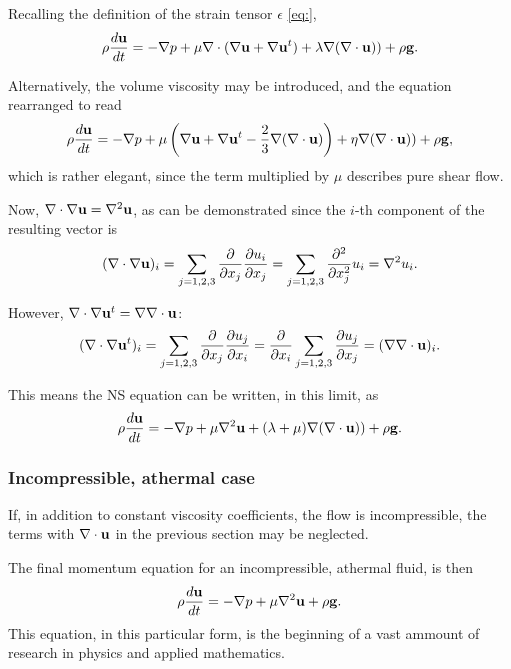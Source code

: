 Recalling the definition of the strain tensor $\epsilon$ \ref{eq:},
\begin{equation*}
  \rho \frac{d\mathbf{u} }{dt} =
  - \nabla p +
  \mu \nabla \cdot  ( \nabla\mathbf{u} + \nabla\mathbf{u}^t )
  + \lambda \nabla ( \nabla\cdot\mathbf{u} ) )
  + \rho \mathbf{g} .
\end{equation*}

Alternatively, the volume viscosity may be introduced, and
the equation rearranged to read
\begin{equation*}
  \rho \frac{d\mathbf{u} }{dt} =
  - \nabla p 
  + \mu \left(  \nabla\mathbf{u} + \nabla\mathbf{u}^t  - \frac23 \nabla ( \nabla\cdot\mathbf{u} ) \right)
  +  \eta \nabla ( \nabla\cdot\mathbf{u} ) )
  + \rho \mathbf{g} ,
\end{equation*}
which is rather elegant, since the term multiplied by $\mu$ describes
pure shear flow.

Now, $\nabla \cdot  \nabla\mathbf{u} = \nabla^2 \mathbf{u}$, as can be demonstrated
since the $i$-th component of the resulting vector is
\[
(\nabla \cdot \nabla\mathbf{u} )_i =
\sum_{j=1,2,3} 
\frac{\partial}{\partial x_j} 
\frac{\partial u_i}{\partial x_j}
=
\sum_{j=1,2,3} 
\frac{\partial^2 }{\partial x_j^2} 
u_i = \nabla^2 u_i .
\]

However, $\nabla \cdot  \nabla\mathbf{u}^t = \nabla  \nabla\cdot\mathbf{u}$:
\[
(\nabla \cdot \nabla\mathbf{u}^t )_i =
\sum_{j=1,2,3} 
\frac{\partial}{\partial x_j} 
\frac{\partial u_j}{\partial x_i}
=
\frac{\partial}{\partial x_i} 
\sum_{j=1,2,3} 
\frac{\partial u_j }{\partial x_j} 
= (\nabla  \nabla\cdot\mathbf{u})_i .
\]

This means the NS equation can be written, in this limit,
as
\begin{equation}
  \label{eq:NS_const_viscs}
  \rho \frac{d\mathbf{u} }{dt} =
  - \nabla p +
   \mu \nabla^2  \mathbf{u}
  + ( \lambda  + \mu) \nabla ( \nabla\cdot\mathbf{u} ) )
  + \rho \mathbf{g} .
\end{equation}





\subsubsection{Incompressible, athermal case}

If, in addition to constant viscosity coefficients, the flow is
incompressible, the terms with $\nabla\cdot\mathbf{u}$ in the previous section may be
neglected.

The final momentum equation for an incompressible, athermal fluid, is
then
\begin{equation}
  \label{eq:NS_usual}
  \rho \frac{d\mathbf{u} }{dt} =
  - \nabla p 
  + \mu \nabla^2 \mathbf{u}
  + \rho \mathbf{g} .
\end{equation}
This equation, in this particular form, is the beginning of a vast
ammount of research in physics and applied mathematics.






